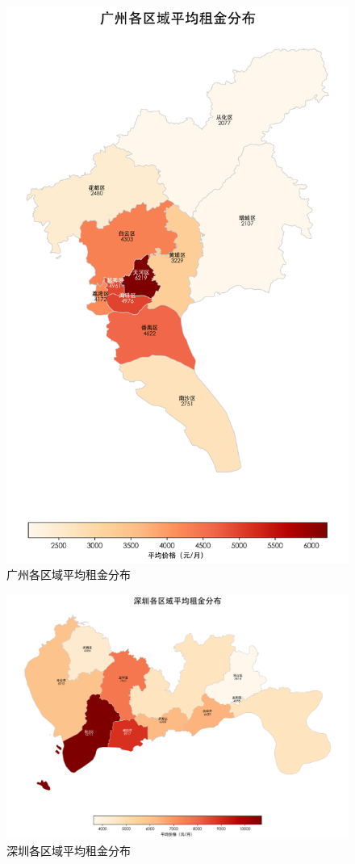 \begin{figure}[htbp]
    \centering
    \includegraphics[width=0.7\linewidth]{../../figure/gz_region_heat_map.png}
    \caption{广州各区域平均租金分布}
    \label{fig:gz_region_heat_map}
\end{figure}
\begin{figure}[htbp]
    \centering
    \includegraphics[width=0.7\linewidth]{../../figure/sz_region_heat_map.png}
    \caption{深圳各区域平均租金分布}
    \label{fig:sz_region_heat_map}
\end{figure}
